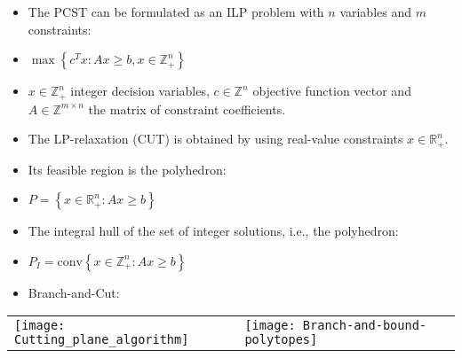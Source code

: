 \documentclass[11pt, a4paper, landscape]{article}
\begin{document}
\NewPage{}
\vfill
\begin{itemize}
\item The PCST can be formulated as an ILP problem with $n$ variables and $m$ constraints:
\item[]
\begin{center}
$\max \left\lbrace c^Tx : Ax \geq b, x \in \mathbb{Z}_+^n \right\rbrace $
\end{center}
\item $x \in \mathbb{Z}_+^n$ integer decision variables, $c \in \mathbb{Z}^n$ objective function vector and $A \in \mathbb{Z}^{m \times n}$ the matrix of constraint coefficients.
\item The LP-relaxation (CUT) is obtained by using real-value constraints $x \in \mathbb{R}_+^n$.
\item Its feasible region is the polyhedron:
\item[]
\begin{center}
$P = \left\lbrace x \in \mathbb{R}_+^n : Ax \geq b \right\rbrace $
\end{center}
\item The integral hull of the set of integer solutions, i.e., the polyhedron:
\item[]
\begin{center}
$P_I = \mbox{conv} \left\lbrace x \in \mathbb{Z}_+^n : Ax \geq b \right\rbrace $
\end{center}
\item Branch-and-Cut:
\end{itemize}
\begin{table}
  \centering
  \begin{tabular}{@{} M{.5\linewidth} M{.5\linewidth} @{}}
  	\texttt{[image: Cutting\_plane\_algorithm]}
      &
    \texttt{[image: Branch-and-bound-polytopes]}
  \end{tabular}
\end{table}
\vfill
\end{document}
